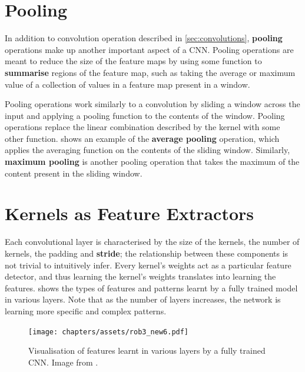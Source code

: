 \section{Pooling}\label{sec:conv-pooling}

In addition to convolution operation described in \cref{sec:convolutions}, \textbf{pooling} operations make up another important aspect of a CNN. Pooling operations are meant to reduce the size of the feature maps by using some function to \textbf{summarise} regions of the feature map, such as taking the average or maximum value of a collection of values in a feature map present in a window.

Pooling operations work similarly to a convolution by sliding a window across the input and applying a pooling function to the contents of the window. 
Pooling operations replace the linear combination described by the kernel with some other function.  shows an example of the \textbf{average pooling} operation, which applies the averaging function on the contents of the sliding window. Similarly, \textbf{maximum pooling} is another pooling operation that takes the maximum of the content present in the sliding window.

\section{Kernels as Feature Extractors}\label{sec:kernel-feature-extractor}
Each convolutional layer is characterised by the size of the kernels, the number of kernels, the padding and \textbf{stride}; the relationship between these components is not trivial to intuitively infer. Every kernel's weights act as a particular feature detector, and thus learning the kernel's weights translates into learning the features.  shows the types of features and patterns learnt by a fully trained model in various layers. Note that as the number of layers increases, the network is learning more specific and complex patterns.

\begin{figure}[ht]
    \centering
    \captionsetup{justification=RaggedRight}
    \texttt{[image: chapters/assets/rob3\_new6.pdf]}
    \caption{Visualisation of features learnt in various layers by a fully trained CNN. Image from \textcite{Zeiler2013}.}
    \label{fig:feature-viz}
\end{figure}